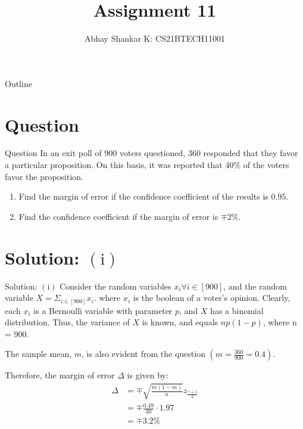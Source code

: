 \documentclass{beamer}
\begin{document}
\newcommand{\bfr}[2]{\section{#1} \begin{frame}{#1} #2 \end{frame}}

	\title{Assignment 11}
		\author{ Abhay Shankar K: CS21BTECH11001}
\date{}
	\begin{frame}
    		\titlepage	
	\end{frame}

	\begin{frame}{Outline}
    		\tableofcontents
	\end{frame}

	\providecommand{\brak}[1]{\ensuremath{\left(#1\right)}}
	\providecommand{\rpr}[2]{\ensuremath{P_{#1}\left(#2\right)}} %
	\providecommand{\spr}[1]{\ensuremath{P\left(#1\right)}} %
	\newcommand{\abs}[1]{\left| #1 \right|}
	\providecommand{\sbrak}[1]{\ensuremath{\left[#1\right]}}
    \newcommand{\myvec}[1]{\ensuremath{\begin{pmatrix}#1\end{pmatrix}}}
	
	\providecommand{\pmf}[2]{\ensuremath{f_{#2}\left(#1\right)}}
	\providecommand{\cdf}[2]{\ensuremath{F_{#2}\left(#1\right)}}
	\newcommand{\e}[1]{\ensuremath{e^{#1}}}
	\providecommand{\inv}[1]{\ensuremath{\frac{1}{#1}}}
	
	\bfr{Question}{
		In an exit poll of $900$ voters questioned, $360$ responded that they favor a particular
        proposition. On this basis, it was reported that $40\%$ of the voters favor the proposition.

        \begin{enumerate}[label = \brak{\textbf{\roman*}}]
            \item Find the margin of error if the confidence coefficient of the results is $0.95$.
            \item Find the confidence coefficient if the margin of error is $\mp 2\%$.
        \end{enumerate}
	}

    \bfr{Solution: \brak{\textrm{i}}}{
        Consider the random variables $x_i \forall i \in \sbrak{900}$, and the random variable $X = \Sigma_{i \in \sbrak{900}} x_i$.
        where $x_i$ is the boolean of a voter's opinion. Clearly, each $x_i$ is a Bernoulli variable
        with parameter $p$, and $X$ has a binomial distribution. Thus, the variance of $X$ is known, and equals $np\brak{1 - p}$, where n = $900$.

		The sample mean, $m$, is also evident from the question \brak{m = \frac{360}{900} = 0.4}.

        Therefore, the margin of error $\Delta$ is given by:
        \begin{align}
            \Delta &= \mp \sqrt{\frac{m\brak{1 - m}}{n}} z_\frac{\gamma + 1}{2} \label{form} \\
            &= \mp \frac{0.49}{30} \cdot 1.97 \nonumber \\
			&= \mp 3.2 \% \label{error}
        \end{align}
	}
\end{document}
